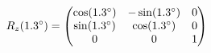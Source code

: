 \documentclass[preview]{standalone}
\begin{document}
\begin{align*}
\special{dvisvgm:raw <g id='unique000'>}R_z(1.3^\circ) = \begin{pmatrix} \cos(1.3^\circ) & -\sin(1.3^\circ) & 0 \\ \sin(1.3^\circ) & \cos(1.3^\circ) & 0 \\ 0 & 0 & 1 \end{pmatrix}\special{dvisvgm:raw </g>}
\end{align*}
\end{document}
